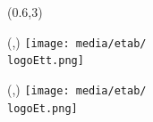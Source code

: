\begin{textblock}{1}(0.6,3)
	\Large{}
\end{textblock}


                            

\begin{textblock}{1}(\hpostt,\vpostt)
	\texttt{[image: media/etab/\\logoEtt.png]} 
\end{textblock}

\begin{textblock}{1}(\hpos,\vpos)
	\texttt{[image: media/etab/\\logoEt.png]}
\end{textblock}

